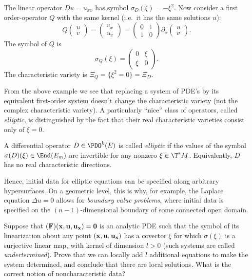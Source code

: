 \begin{example}
    The linear operator $Du=u_{xx}$ has symbol $\sigma_D(\xi)=-\xi^2$. Now consider a first order-operator $Q$ with the same kernel (i.e.\ it has the same solutions $u$):
    \[Q\begin{pmatrix}
        u\\v
    \end{pmatrix}=
    \begin{pmatrix}
        v_x\\u_x
    \end{pmatrix}=
    \begin{pmatrix}
        0& 1\\1&0
    \end{pmatrix}
    \partial_x
    \begin{pmatrix}
        u\\v
    \end{pmatrix}.
    \]
    The symbol of $Q$ is 
    \[\sigma_Q(\xi)=\begin{pmatrix}
        0&\xi\\\xi&0
    \end{pmatrix}.\]
    The characteristic variety is $\Xi_Q=\{\xi^2=0\}=\Xi_D$.
\end{example}

From the above example we see that replacing a system of PDE's by its equivalent first-order system doesn't change the characteristic variety (not the complex characteristic variety). A particularly ``nice'' class of operators, called \emph{elliptic}, is distinguished by the fact that their real characteristic varieties consist only of $\xi=0$.

\begin{defn}
    A differential operator $D\in\PDO^k(E)$ is called \emph{elliptic} if the values of the symbol $\sigma(D)(\xi)\in\End(E_m)$ are invertible for any nonzero $\xi\in \T^\ast M$. Equivalently, $D$ has no real characteristic directions.
\end{defn}

Hence, initial data for elliptic equations can be specified along arbitrary hypersurfaces. On a geometric level, this is why, for example, the Laplace equation $\Delta u=0$ allows for \emph{boundary value problems}, where initial data is specified on the $(n-1)$-dimensional boundary of some connected open domain.


\begin{xca}
    Suppose that $\bf(F)(\bf{x},\bf{u},\bf{u}_{\bf x})=0$ is an analytic PDE such that the symbol of its linearization about any point $(\bf{x},\bf{u},\bf{u}_{\bf{x}})$ has a covector $\xi$ for which $\sigma(\xi)$ is a surjective linear map, with kernel of dimension $l>0$ (such systems are called \emph{undertermined}). Prove that we can locally add $l$ additional equations to make the system determined, and conclude that there are local solutions. What is the correct notion of noncharacteristic data?
\end{xca}


